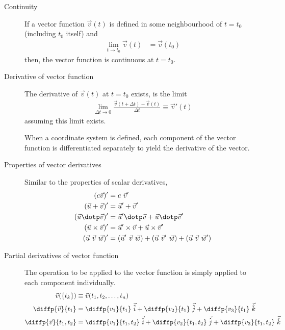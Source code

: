 \begin{description}
    \item[Continuity] If a vector function $ \vec{v}(t) $ is defined in some
          neighbourhood of $ t = t_0 $ (including $ t_0 $ itself) and
          \begin{align}
              \lim_{t \to t_0} \vec{v}(t) & = \vec{v}(t_0)
          \end{align}
          then, the vector function is continuous at $ t = t_0 $.

    \item[Derivative of vector function] The derivative of $ \vec{v}(t) $ at $ t= t_0 $
          exists, is the limit
          \begin{align}
              \lim_{\Delta t \to 0} \frac{\vec{v}(t + \Delta t) - \vec{v}(t)}
              {\Delta t} \equiv \vec{v}'(t)
          \end{align}
          assuming this limit exists. \par
          When a coordinate system is defined, each component of the vector function is
          differentiated separately to yield the derivative of the vector.

    \item[Properties of vector derivatives] Similar to the properties of scalar
          derivatives,
          \begin{align}
              (c\vec{v})'                  & = c\ \vec{v}'                  \\
              (\vec{u} + \vec{v})'         & = \vec{u}' + \vec{v}'          \\
              (\vec{u} \dotp \vec{v})'     &
              = \vec{u}' \dotp \vec{v} + \vec{u} \dotp \vec{v}'             \\
              (\vec{u} \times \vec{v})'    &
              = \vec{u}' \times \vec{v} + \vec{u} \times \vec{v}'           \\
              (\vec{u}\ \vec{v}\ \vec{w})' & = (\vec{u}'\ \vec{v}\ \vec{w})
              + (\vec{u}\ \vec{v}'\ \vec{w}) + (\vec{u}\ \vec{v}\ \vec{w}')
          \end{align}

    \item[Partial derivatives of vector function] The operation to be applied to the
          vector function is simply applied to each component individually.
          \begin{align}
              \vec{v}(\{t_k\})          & \equiv \vec{v}(t_1, t_2, \dots, t_n)   \\
              \diffp{\vec{v}}{t_1}      & = \diffp{v_1}{t_1}\ \vec{\hat{i}}
              + \diffp{v_2}{t_1}\ \vec{\hat{j}}
              + \diffp{v_3}{t_1}\ \vec{\hat{k}}                                  \\
              \diffp{\vec{v}}{t_1, t_2} & = \diffp{v_1}{t_1, t_2}\ \vec{\hat{i}}
              + \diffp{v_2}{t_1, t_2}\ \vec{\hat{j}}
              + \diffp{v_3}{t_1, t_2}\ \vec{\hat{k}}
          \end{align}
\end{description}

